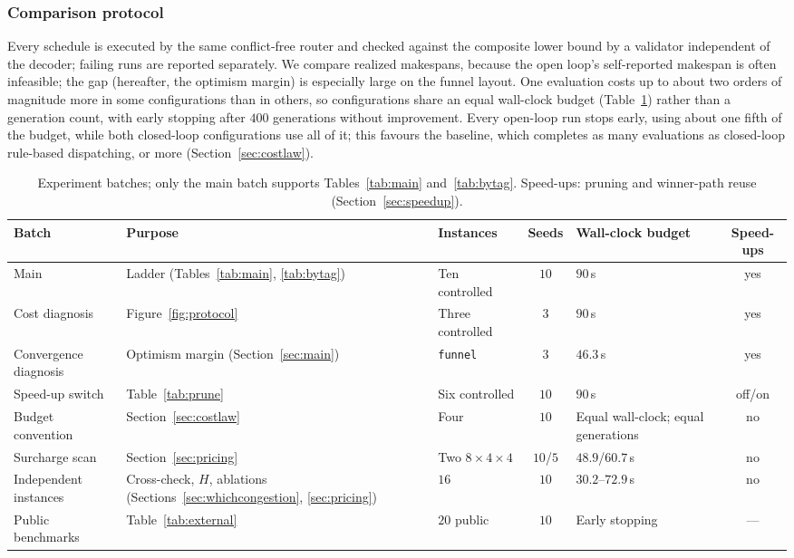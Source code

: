 \documentclass[preprint,review,12pt,authoryear]{elsarticle}
\newcommand{\NSeeds}{10}
\newcommand{\MatrixCells}{16}
\newcommand{\PubNInst}{20}
\begin{document}
\subsubsection{Comparison protocol}
\label{sec:protocol}

Every schedule is executed by the same conflict-free router and checked against the composite lower bound by a validator independent of the decoder; failing runs are reported separately.
We compare realized makespans, because the open loop's self-reported makespan is often infeasible; the gap (hereafter, the optimism margin) is especially large on the funnel layout.
One evaluation costs up to about two orders of magnitude more in some configurations than in others, so configurations share an equal wall-clock budget (Table~\ref{tab:batches}) rather than a generation count, with early stopping after $400$ generations without improvement.
Every open-loop run stops early, using about one fifth of the budget, while both closed-loop configurations use all of it; this favours the baseline, which completes as many evaluations as closed-loop rule-based dispatching, or more (Section~\ref{sec:costlaw}).

\begin{table}[!htbp]
\caption{Experiment batches; only the main batch supports Tables~\ref{tab:main} and~\ref{tab:bytag}. Speed-ups: pruning and winner-path reuse (Section~\ref{sec:speedup}).}
\label{tab:batches}
\footnotesize
\begin{adjustbox}{max width=\linewidth}\begin{tabular}{@{}>{\raggedright\arraybackslash}p{2.3cm}>{\raggedright\arraybackslash}p{3.2cm}>{\raggedright\arraybackslash}p{2.1cm}c>{\raggedright\arraybackslash}p{2.4cm}c@{}}
\toprule
Batch & Purpose & Instances & Seeds & Wall-clock budget & Speed-ups \\
\midrule
Main & Ladder (Tables~\ref{tab:main}, \ref{tab:bytag}) & Ten controlled & $\NSeeds$ & $90$\,s & yes \\
Cost diagnosis & Figure~\ref{fig:protocol} & Three controlled & $3$ & $90$\,s & yes \\
Convergence diagnosis & Optimism margin (Section~\ref{sec:main}) & \texttt{funnel} & $3$ & $46.3$\,s & yes \\
Speed-up switch & Table~\ref{tab:prune} & Six controlled & $10$ & $90$\,s & off/on \\
Budget convention & Section~\ref{sec:costlaw} & Four & $10$ & Equal wall-clock; equal generations & no \\
Surcharge scan & Section~\ref{sec:pricing} & Two $8\times4\times4$ & $10$/$5$ & $48.9$/$60.7$\,s & no \\
Independent instances & Cross-check, $H$, ablations (Sections~\ref{sec:whichcongestion}, \ref{sec:pricing}) & $\MatrixCells$ & $10$ & $30.2$--$72.9$\,s & no \\
Public benchmarks & Table~\ref{tab:external} & $\PubNInst$ public & $\NSeeds$ & Early stopping & --- \\
\bottomrule
\end{tabular}\end{adjustbox}
\end{table}
\end{document}
